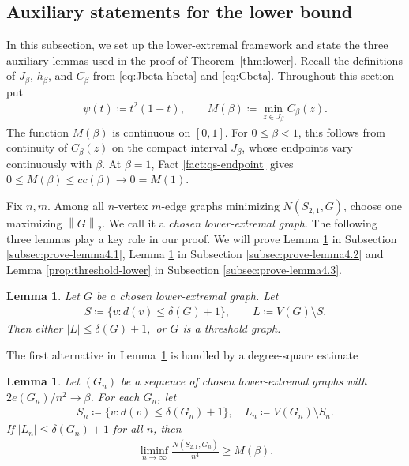 \documentclass[10pt,a4paper]{article}
\newtheorem{lemma}[definition]{Lemma}
\newcommand{\norm}[1]{\left\lVert#1\right\rVert}%
\begin{document}
\subsection{Auxiliary statements for the lower bound}\label{subsec:auxiliary-statements}
In this subsection, we set up the lower-extremal framework and state the three 
auxiliary lemmas used in the proof of Theorem~\ref{thm:lower}.
Recall the definitions of $J_\beta$, $h_\beta$, and $C_\beta$ from
\eqref{eq:Jbeta-hbeta} and \eqref{eq:Cbeta}.  Throughout this section put   
\begin{align*}
  \psi(t)\coloneqq t^2(1-t),
  \qquad
  M(\beta)\coloneqq\min_{z\in J_\beta}C_\beta(z).
\end{align*}
The function $M(\beta)$ is continuous on $[0,1]$.  For $0\le\beta<1$, this follows from continuity of $C_\beta(z)$ on the compact interval $J_\beta$, whose endpoints vary continuously with $\beta$.  At $\beta=1$, Fact \ref{fact:qs-endpoint} gives $0\le  M(\beta)\le cc(\beta)\to0=M(1)$.

Fix $n,m$. Among all $n$-vertex $m$-edge graphs minimizing $N(S_{2,1},G)$, choose one maximizing $\norm{G}_2$. We call it a \emph{chosen lower-extremal graph}.  The following three lemmas play a key role in our proof. We will prove Lemma \ref{prop:lower-dichotomy} in Subsection \ref{subsec:prove-lemma4.1}, Lemma \ref{lem:cauchy-branch} in Subsection \ref{subsec:prove-lemma4.2} and Lemma \ref{prop:threshold-lower} in Subsection \ref{subsec:prove-lemma4.3}. 

\begin{lemma}\label{prop:lower-dichotomy}
Let $G$ be a chosen lower-extremal graph.  Let
\begin{align*}
  S\coloneqq\{v:d(v)\le\delta(G)+1\},
  \qquad L\coloneqq V(G)\setminus S.
\end{align*}
Then either
$
  |L|\le\delta(G)+1,
$
or $G$ is a threshold graph.
\end{lemma}

The first alternative in Lemma~\ref{prop:lower-dichotomy} is handled by a degree-square 
estimate

\begin{lemma}\label{lem:cauchy-branch}
Let $(G_n)$ be a sequence of chosen lower-extremal graphs with $2e(G_n)/n^2\to\beta$. For each $G_n$, let 
\begin{align*}
    S_n\coloneqq\{v: d(v)\le\delta(G_n)+1\},\quad L_n\coloneqq V(G_n)\setminus S_n.
\end{align*} 
If $|L_n|\le\delta(G_n)+1$ for all $n$, then
\begin{align*}
 \liminf_{n\to\infty} \frac{N(S_{2,1},G_n)}{n^4}\ge M(\beta).
\end{align*}
\end{lemma}
\end{document}
